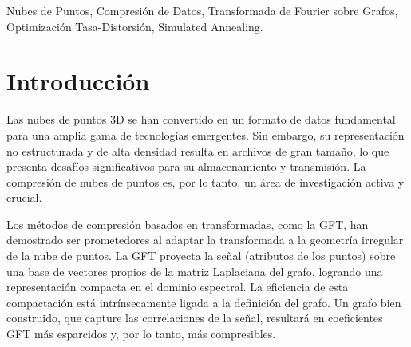 \begin{abstract}
La creciente popularidad de las nubes de puntos 3D en aplicaciones como la realidad virtual y los vehículos autónomos
han generado una necesidad crítica de algoritmos de compresión eficientes. Este trabajo explora un método de compresión
con pérdida para nubes de puntos estáticas, utilizando la Transformada de Fourier sobre Grafos (GFT) para explotar la
correlación espacial de los atributos de la nube, como la luminancia. El rendimiento de la GFT depende
fundamentalmente de la estructura del grafo subyacente. Para optimizar esta dependencia, se propone un novedoso
algoritmo de agrupamiento basado en optimización Tasa-Distorsión (RD). A diferencia del k-means tradicional, este
método agrupa bloques de la nube de puntos asignándolos a centroides (modos de la señal) que minimizan un costo
combinado de tasa de bits y error de cuantización. Se introduce un esquema de Simulated Annealing para mejorar la
exploración del espacio de soluciones y evitar la convergencia a mínimos locales, resultando en un conjunto de
transformadas adaptativas que mejoran la eficiencia de la compresión.
\end{abstract}

\begin{IEEEkeywords}
Nubes de Puntos, Compresión de Datos, Transformada de Fourier sobre Grafos, Optimización Tasa-Distorsión, Simulated
Annealing.
\end{IEEEkeywords}

\section{Introducción}
Las nubes de puntos 3D se han convertido en un formato de datos fundamental para una amplia gama de tecnologías
emergentes. Sin embargo, su representación no estructurada y de alta densidad resulta en archivos de gran tamaño, lo
que presenta desafíos significativos para su almacenamiento y transmisión. La compresión de nubes de puntos es, por lo
tanto, un área de investigación activa y crucial.

Los métodos de compresión basados en transformadas, como la GFT, han demostrado ser prometedores al adaptar la
transformada a la geometría irregular de la nube de puntos. La GFT proyecta la señal (atributos de los puntos) sobre
una base de vectores propios de la matriz Laplaciana del grafo, logrando una representación compacta en el dominio
espectral. La eficiencia de esta compactación está intrínsecamente ligada a la definición del grafo. Un grafo bien
construido, que capture las correlaciones de la señal, resultará en coeficientes GFT más esparcidos y, por lo tanto,
más compresibles.


